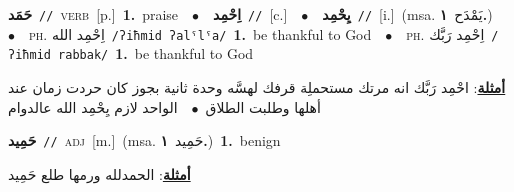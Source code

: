 \documentclass[10pt,a4paper,twoside]{article} %
\begin{document}
\begin{multicols}{2}
{\setlength\topsep{0pt}\textbf{\foreignlanguage{arabic}{حَمَد}}\ {\color{gray}\texttt{//}\color{black}}\ \textsc{verb}\ [p.]\ \textbf{1.}~praise\ \ $\bullet$\ \ \setlength\topsep{0pt}\textbf{\foreignlanguage{arabic}{اِحْمِد}}\ {\color{gray}\texttt{//}\color{black}}\ [c.]\ \ $\bullet$\ \ \setlength\topsep{0pt}\textbf{\foreignlanguage{arabic}{يِحْمِد}}\ {\color{gray}\texttt{//}\color{black}}\ [i.]\ \color{gray}(msa. \foreignlanguage{arabic}{يَمْدَح}~\foreignlanguage{arabic}{\textbf{١.}})\color{black}\ \ $\bullet$\ \ \textsc{ph.} \color{gray} \foreignlanguage{arabic}{اِحْمِد الله}\color{black}\ {\color{gray}\texttt{/{\sffamily ʔiħmid ʔalˤlˤa}/}\color{black}}\ \textbf{1.}~be thankful to God\ \ $\bullet$\ \ \textsc{ph.} \color{gray} \foreignlanguage{arabic}{اِحْمِد رَبَّك}\color{black}\ {\color{gray}\texttt{/{\sffamily ʔiħmid rabbak}/}\color{black}}\ \textbf{1.}~be thankful to God\  \begin{flushright}\color{gray}\foreignlanguage{arabic}{\textbf{\underline{\foreignlanguage{arabic}{أمثلة}}}: احْمِد رَبَّك انه مرتك مستحملِة قرفك لهسَّه وحدة ثانية بجوز كان حردت زمان عند أهلها وطلبت الطلاق\ $\bullet$\ \  الواحد لازم يِحْمِد الله عالدوام}\end{flushright}\color{black}} \vspace{2mm}

{\setlength\topsep{0pt}\textbf{\foreignlanguage{arabic}{حَمِيد}}\ {\color{gray}\texttt{//}\color{black}}\ \textsc{adj}\ [m.]\ \color{gray}(msa. \foreignlanguage{arabic}{حَمِيد}~\foreignlanguage{arabic}{\textbf{١.}})\color{black}\ \textbf{1.}~benign\  \begin{flushright}\color{gray}\foreignlanguage{arabic}{\textbf{\underline{\foreignlanguage{arabic}{أمثلة}}}: الحمدلله ورمها طلع حَمِيد}\end{flushright}\color{black}} \vspace{2mm}


\end{multicols}
\end{document}
